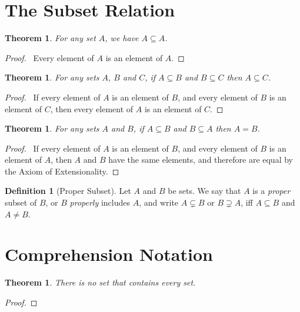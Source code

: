 \documentclass{report}
\let\qed\relax
\newtheorem{thm}[ax]{Theorem}
\theoremstyle{definition}
\newtheorem{df}[ax]{Definition}
\begin{document}
\section{The Subset Relation}

\begin{thm}
For any set $A$, we have $A \subseteq A$.
\end{thm}

\begin{proof}
\pf\ Every element of $A$ is an element of $A$. \qed
\end{proof}

\begin{thm}
For any sets $A$, $B$ and $C$, if $A \subseteq B$ and $B \subseteq C$ then $A \subseteq C$.
\end{thm}

\begin{proof}
\pf\ If every element of $A$ is an element of $B$, and every element of $B$ is an element of $C$, then every element of $A$ is an element of $C$. \qed
\end{proof}

\begin{thm}
For any sets $A$ and $B$, if $A \subseteq B$ and $B \subseteq A$ then $A = B$.
\end{thm}

\begin{proof}
\pf\ If every element of $A$ is an element of $B$, and every element of $B$ is an element of $A$, then $A$ and $B$ have the same elements, and therefore are equal by the Axiom of Extensionality. \qed
\end{proof}

\begin{df}[Proper Subset]
Let $A$ and $B$ be sets. We say that $A$ is a \emph{proper} subset of $B$, or $B$ \emph{properly} includes $A$, and write $A \subsetneq B$ or $B \supsetneq A$, iff $A \subseteq B$ and $A \neq B$.
\end{df}

\section{Comprehension Notation}

\begin{thm}
There is no set that contains every set.
\end{thm}

\begin{proof}
\pf
{}
\qed
\end{proof}
\end{document}
